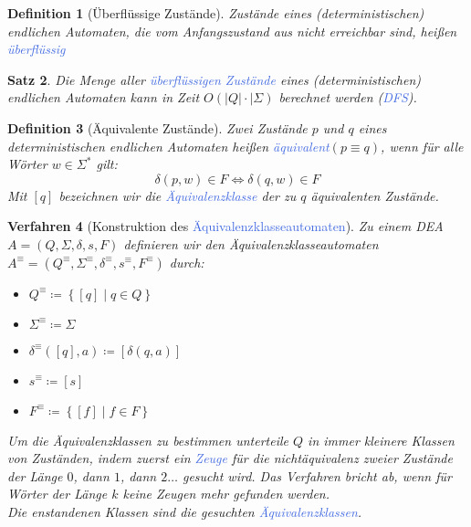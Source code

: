 \documentclass[11pt]{article}
\newcommand{\tcol}[1]{\textcolor{RoyalBlue}{#1}}
\newcommand{\set}[1]{\left\lbrace #1\right\rbrace}
\theoremstyle{break}
\newtheorem{satz}{Satz}[section]
\newtheorem{defi}[satz]{Definition}
\newtheorem{verf}[satz]{Verfahren}
\begin{document}
    \begin{defi}[Überflüssige Zustände]
        Zustände eines (deterministischen) endlichen Automaten, die vom Anfangszustand aus nicht erreichbar sind, heißen \tcol{überflüssig}
    \end{defi}

    \begin{satz}
        Die Menge aller \tcol{überflüssigen Zustände} eines (deterministischen) endlichen Automaten kann in Zeit $O(|Q|\cdot |\Sigma)$ berechnet werden (\tcol{DFS}).
    \end{satz}

    \begin{defi}[Äquivalente Zustände]
        Zwei Zustände $p$ und $q$ eines deterministischen endlichen Automaten heißen \tcol{äquivalent}$(p\equiv q)$, wenn für alle Wörter $w\in\Sigma^*$ gilt:
        \[\delta(p,w)\in F\Leftrightarrow\delta(q,w)\in F\]
        Mit $[q]$ bezeichnen wir die \tcol{Äquivalenzklasse} der zu $q$ äquivalenten Zustände.
    \end{defi}

    \begin{verf}[Konstruktion des \tcol{Äquivalenzklasseautomaten}]
        Zu einem DEA $A=(Q,\Sigma,\delta ,s,F)$ definieren wir den Äquivalenzklasseautomaten $A^\equiv=(Q^\equiv ,\Sigma^\equiv ,\delta^\equiv ,s^\equiv ,F^\equiv)$ durch:
        \begin{itemize}
            \item $Q^\equiv\coloneqq\set{[q]\mid q\in Q}$
            \item $\Sigma^\equiv\coloneqq\Sigma$
            \item $\delta^\equiv([q],a)\coloneqq[\delta(q,a)]$
            \item $s^\equiv\coloneqq[s]$
            \item $F^\equiv\coloneqq\set{[f]\mid f\in F}$
        \end{itemize}
        Um die Äquivalenzklassen zu bestimmen unterteile $Q$ in immer kleinere Klassen von Zuständen, indem zuerst ein \tcol{Zeuge} für die nichtäquivalenz zweier Zustände der Länge $0$, dann $1$, dann $2\dots$ gesucht wird.
        Das Verfahren bricht ab, wenn für Wörter der Länge $k$ keine Zeugen mehr gefunden werden.\\
        Die enstandenen Klassen sind die gesuchten \tcol{Äquivalenzklassen}.
    \end{verf}
\end{document}
